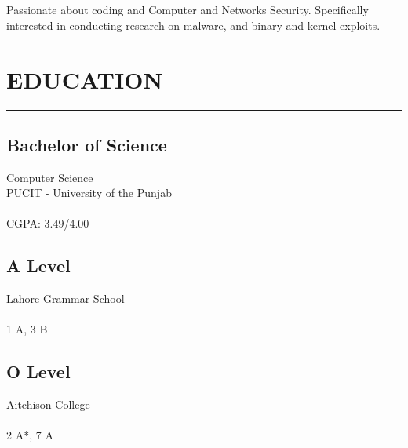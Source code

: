 \documentclass[]{resume}
\begin{document}
%
%

\begin{minipage}[t]{0.33\textwidth}

    \begin{large}
        \\
    \end{large}

    \vspace{4pt}
    \noindent {}\\
    Passionate about coding and Computer and Networks Security. Specifically interested in conducting research on malware, and binary and kernel exploits.



    \section{EDUCATION}
    \noindent\rule{5 cm}{0.4pt}

    \subsection{Bachelor of Science}
    \noindent Computer Science\\
    PUCIT - University of the Punjab\\
    \\
    CGPA: 3.49/4.00

    \vspace{8pt}
    \subsection{A Level}
    \noindent Lahore Grammar School\\
    \\
    1 A, 3 B

    \vspace{8pt}
    \subsection{O Level}
    \noindent Aitchison College\\
    \\
    2 A*, 7 A


\end{minipage}
\end{document}
